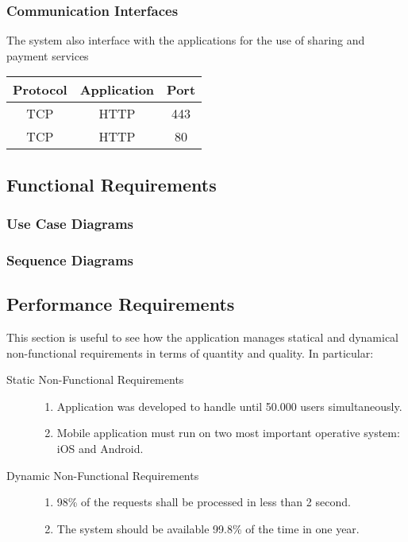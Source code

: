 	\subsubsection{Communication Interfaces}
		The system also interface with the applications for the use of sharing and payment services
		\hfill
		\begin{tabular}{| c | c | c |}
			\hline
			Protocol	& Application	& Port \\
			\hline
			\hline
			TCP		& HTTP		& 443 \\
			\hline
			TCP		& HTTP		& 80 \\
			\hline
		\end{tabular}
	
\subsection{Functional Requirements}
	
	
	\subsubsection{Use Case Diagrams}
		

	\subsubsection{Sequence Diagrams}
				
			
\subsection{Performance Requirements}
This section is useful to see how the application manages statical and dynamical non-functional requirements in terms of quantity and quality. 
	In particular:
	\begin{description}
		\item[Static Non-Functional Requirements]	\vfill
		\hfill
		\begin{enumerate}
			\item Application was developed to handle until 50.000 users simultaneously.
			\item Mobile application must run on two most important operative system: iOS and Android.
		\end{enumerate}
		
		\item[Dynamic Non-Functional Requirements] \vfill
		\hfill
		\begin{enumerate}
			\item 98\% of the requests shall be processed in less than 2 second.
			\item The system should be available 99.8\% of the time in one year.
		\end{enumerate}			

	\end{description}
		
